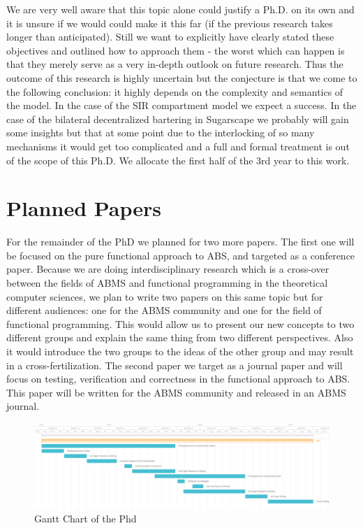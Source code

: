 We are very well aware that this topic alone could justify a Ph.D. on its own and it is unsure if we would could make it this far (if the previous research takes longer than anticipated). Still we want to explicitly have clearly stated these objectives and outlined how to approach them - the worst which can happen is that they merely serve as a very in-depth outlook on future research.
Thus the outcome of this research is highly uncertain but the conjecture is that we come to the following conclusion: it highly depends on the complexity and semantics of the model. In the case of the SIR compartment model we expect a success. In the case of the bilateral decentralized bartering in Sugarscape we probably will gain some insights but that at some point due to the interlocking of so many mechanisms it would get too complicated and a full and formal treatment is out of the scope of this Ph.D.
We allocate the first half of the 3rd year to this work.

\section{Planned Papers}
For the remainder of the PhD we planned for two more papers.
The first one will be focused on the pure functional approach to ABS, and targeted as a conference paper. Because we are doing interdisciplinary research which is a cross-over between the fields of ABMS and functional programming in the theoretical computer sciences, we plan to write two papers on this same topic but for different audiences: one for the ABMS community and one for the field of functional programming. This would allow us to present our new concepts to two different groups and explain the same thing from two different perspectives. Also it would introduce the two groups to the ideas of the other group and may result in a cross-fertilization.
The second paper we target as a journal paper and will focus on testing, verification and correctness in the functional approach to ABS. This paper will be written for the ABMS community and released in an ABMS journal. 

\clearpage

\begin{landscape}
	\label{fig:gantt}
	\centering
	
	\begin{figure}
	\centering
	\includegraphics[width=1.5\textwidth, angle=0]{./fig/phd_gantt.png}
	\caption{Gantt Chart of the Phd}
	\label{fig:gantt}
\end{figure}
\end{landscape}